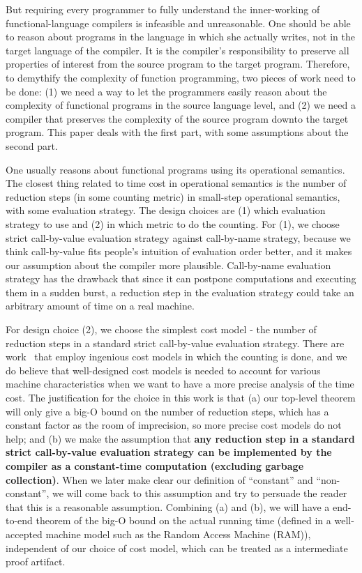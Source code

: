 \documentclass[preprint]{sigplanconf}
\begin{document}
But requiring every programmer to fully understand the inner-working of functional-language compilers is infeasible and unreasonable. One should be able to reason about programs in the language in which she actually writes, not in the target language of the compiler. It is the compiler's responsibility to preserve all properties of interest from the source program to the target program. Therefore, to demythify the complexity of function programming, two pieces of work need to be done: (1) we need a way to let the programmers easily reason about the complexity of functional programs in the source language level, and (2) we need a compiler that preserves the complexity of the source program downto the target program. This paper deals with the first part, with some assumptions about the second part. 

One usually reasons about functional programs using its operational semantics. The closest thing related to time cost in operational semantics is the number of reduction steps (in some counting metric) in small-step operational semantics, with some evaluation strategy. The design choices are (1) which evaluation strategy to use and (2) in which metric to do the counting. For (1), we choose strict call-by-value evaluation strategy against call-by-name strategy, because we think call-by-value fits people's intuition of evaluation order better, and it makes our assumption about the compiler more plausible. Call-by-name evaluation strategy has the drawback that since it can postpone computations and executing them in a sudden burst, a reduction step in the evaluation strategy could take an arbitrary amount of time on a real machine.

For design choice (2), we choose the simplest cost model - the number of reduction steps in a standard strict call-by-value evaluation strategy. There are work~\cite{blelloch2013cache} that employ ingenious cost models in which the counting is done, and we do believe that well-designed cost models is needed to account for various machine characteristics when we want to have a more precise analysis of the time cost. The justification for the choice in this work is that (a) our top-level theorem will only give a big-O bound on the number of reduction steps, which has a constant factor as the room of imprecision, so more precise cost models do not help; and (b) we make the assumption that {\bf any reduction step in a standard strict call-by-value evaluation strategy can be implemented by the compiler as a constant-time computation (excluding garbage collection)}. When we later make clear our definition of ``constant'' and ``non-constant'', we will come back to this assumption and try to persuade the reader that this is a reasonable assumption. Combining (a) and (b), we will have a end-to-end theorem of the big-O bound on the actual running time (defined in a well-accepted machine model such as the Random Access Machine (RAM)), independent of our choice of cost model, which can be treated as a intermediate proof artifact.
\end{document}
